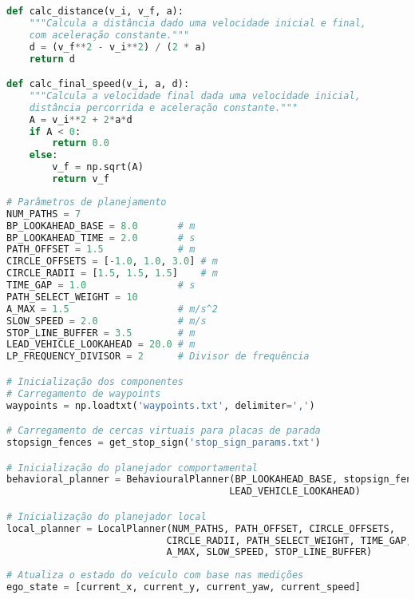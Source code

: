 \documentclass[
	12pt,				%
	oneside, %
	a4paper,			%
	english,			%
	french,				%
	spanish,			%
	brazil				%
	]{abntex2}
\begin{document}
\begin{apendicesenv}
\begin{lstlisting}[language=Python, caption=Implementação das funções para cálculo de distância e velocidade final., label=lst:velocity_utility_functions]
def calc_distance(v_i, v_f, a):
    """Calcula a distância dado uma velocidade inicial e final,
    com aceleração constante."""
    d = (v_f**2 - v_i**2) / (2 * a)
    return d

def calc_final_speed(v_i, a, d):
    """Calcula a velocidade final dada uma velocidade inicial,
    distância percorrida e aceleração constante."""
    A = v_i**2 + 2*a*d
    if A < 0:
        return 0.0
    else:
        v_f = np.sqrt(A)
        return v_f
\end{lstlisting}

\begin{lstlisting}[language=Python, caption=Inicialização dos componentes de planejamento., label=lst:planning_initialization]
# Parâmetros de planejamento
NUM_PATHS = 7
BP_LOOKAHEAD_BASE = 8.0       # m
BP_LOOKAHEAD_TIME = 2.0       # s
PATH_OFFSET = 1.5             # m
CIRCLE_OFFSETS = [-1.0, 1.0, 3.0] # m
CIRCLE_RADII = [1.5, 1.5, 1.5]    # m
TIME_GAP = 1.0                # s
PATH_SELECT_WEIGHT = 10
A_MAX = 1.5                   # m/s^2
SLOW_SPEED = 2.0              # m/s
STOP_LINE_BUFFER = 3.5        # m
LEAD_VEHICLE_LOOKAHEAD = 20.0 # m
LP_FREQUENCY_DIVISOR = 2      # Divisor de frequência

# Inicialização dos componentes
# Carregamento de waypoints
waypoints = np.loadtxt('waypoints.txt', delimiter=',')

# Carregamento de cercas virtuais para placas de parada
stopsign_fences = get_stop_sign('stop_sign_params.txt')

# Inicialização do planejador comportamental
behavioral_planner = BehaviouralPlanner(BP_LOOKAHEAD_BASE, stopsign_fences, 
                                       LEAD_VEHICLE_LOOKAHEAD)

# Inicialização do planejador local
local_planner = LocalPlanner(NUM_PATHS, PATH_OFFSET, CIRCLE_OFFSETS, 
                            CIRCLE_RADII, PATH_SELECT_WEIGHT, TIME_GAP,
                            A_MAX, SLOW_SPEED, STOP_LINE_BUFFER)
\end{lstlisting}

\begin{lstlisting}[language=Python, caption=Ciclo principal de planejamento hierárquico., label=lst:planning_main_loop]
# Atualiza o estado do veículo com base nas medições
ego_state = [current_x, current_y, current_yaw, current_speed]


\end{lstlisting}
\end{apendicesenv}
\end{document}
